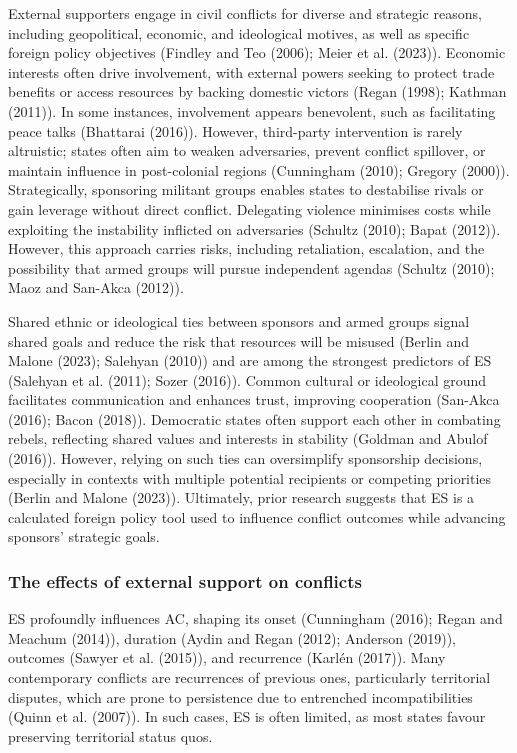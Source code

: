 \documentclass[
]{article}
\begin{document}
External supporters engage in civil conflicts for diverse and strategic
reasons, including geopolitical, economic, and ideological motives, as
well as specific foreign policy objectives (Findley and Teo (2006);
Meier et al. (2023)). Economic interests often drive involvement, with
external powers seeking to protect trade benefits or access resources by
backing domestic victors (Regan (1998); Kathman (2011)). In some
instances, involvement appears benevolent, such as facilitating peace
talks (Bhattarai (2016)). However, third-party intervention is rarely
altruistic; states often aim to weaken adversaries, prevent conflict
spillover, or maintain influence in post-colonial regions (Cunningham
(2010); Gregory (2000)). Strategically, sponsoring militant groups
enables states to destabilise rivals or gain leverage without direct
conflict. Delegating violence minimises costs while exploiting the
instability inflicted on adversaries (Schultz (2010); Bapat (2012)).
However, this approach carries risks, including retaliation, escalation,
and the possibility that armed groups will pursue independent agendas
(Schultz (2010); Maoz and San-Akca (2012)).

Shared ethnic or ideological ties between sponsors and armed groups
signal shared goals and reduce the risk that resources will be misused
(Berlin and Malone (2023); Salehyan (2010)) and are among the strongest
predictors of ES (Salehyan et al. (2011); Sozer (2016)). Common cultural
or ideological ground facilitates communication and enhances trust,
improving cooperation (San-Akca (2016); Bacon (2018)). Democratic states
often support each other in combating rebels, reflecting shared values
and interests in stability (Goldman and Abulof (2016)). However, relying
on such ties can oversimplify sponsorship decisions, especially in
contexts with multiple potential recipients or competing priorities
(Berlin and Malone (2023)). Ultimately, prior research suggests that ES
is a calculated foreign policy tool used to influence conflict outcomes
while advancing sponsors' strategic goals.

\subsubsection{The effects of external support on
conflicts}\label{the-effects-of-external-support-on-conflicts}

ES profoundly influences AC, shaping its onset (Cunningham (2016); Regan
and Meachum (2014)), duration (Aydin and Regan (2012); Anderson (2019)),
outcomes (Sawyer et al. (2015)), and recurrence (Karlén (2017)). Many
contemporary conflicts are recurrences of previous ones, particularly
territorial disputes, which are prone to persistence due to entrenched
incompatibilities (Quinn et al. (2007)). In such cases, ES is often
limited, as most states favour preserving territorial status quos.
\end{document}
